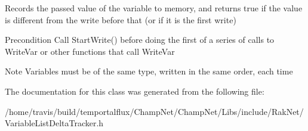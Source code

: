 Records the passed value of the variable to memory, and returns true if the value is different from the write before that (or if it is the first write) \begin{DoxyPrecond}{Precondition}
Call Start\-Write() before doing the first of a series of calls to Write\-Var or other functions that call Write\-Var 
\end{DoxyPrecond}
\begin{DoxyNote}{Note}
Variables must be of the same type, written in the same order, each time 
\end{DoxyNote}


The documentation for this class was generated from the following file\-:\begin{DoxyCompactItemize}
\item 
/home/travis/build/temportalflux/\-Champ\-Net/\-Champ\-Net/\-Libs/include/\-Rak\-Net/Variable\-List\-Delta\-Tracker.\-h\end{DoxyCompactItemize}
